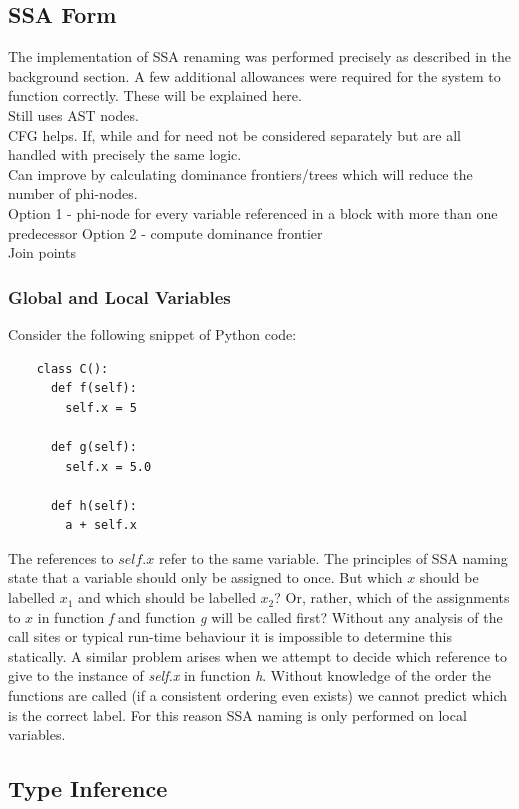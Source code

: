 \documentclass[12pt, titlepage]{article}
\begin{document}
\subsection{SSA Form}
The implementation of SSA renaming was performed precisely as described in the background section. A few additional allowances were required for the system to function correctly. These will be explained here. \\
Still uses AST nodes. \\
CFG helps. If, while and for need not be considered separately but are all handled with precisely the same logic. \\
Can improve by calculating dominance frontiers/trees which will reduce the number of phi-nodes. \\
Option 1 - phi-node for every variable referenced in a block with more than one predecessor
Option 2 - compute dominance frontier \\
Join points

\subsubsection{Global and Local Variables}
Consider the following snippet of Python code:
\begin{lstlisting}
    class C():
      def f(self):
        self.x = 5
     
      def g(self):
        self.x = 5.0         
        
      def h(self):
        a + self.x 
\end{lstlisting}
The references to $self.x$ refer to the same variable. The principles of SSA naming state that a variable should only be assigned to once. But which $x$ should be labelled $x_1$ and which should be labelled $x_2$? Or, rather, which of the assignments to $x$ in function \textit{f} and function \textit{g} will be called first? Without any analysis of the call sites or typical run-time behaviour it is impossible to determine this statically. A similar problem arises when we attempt to decide which reference to give to the instance of \textit{self.x} in function \textit{h}. Without knowledge of the order the functions are called (if a consistent ordering even exists) we cannot predict which is the correct label. For this reason SSA naming is only performed on local variables.


\subsection{Type Inference}
\end{document}
